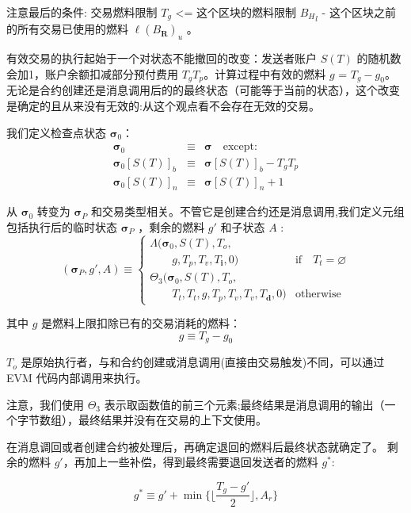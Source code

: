 \documentclass[9pt,oneside]{amsart}
\begin{document}
\begin{multicols}{2}
注意最后的条件: 交易燃料限制 $T_g$  <= 这个区块的燃料限制 ${B_H}_l$ - 这个区块之前的所有交易已使用的燃料 $\ell(B_\mathbf{R})_u$  。


有效交易的执行起始于一个对状态不能撤回的改变：发送者账户 $S(T)$ 的随机数会加1，账户余额扣减部分预付费用 $T_gT_p$。计算过程中有效的燃料 $g$ = $T_g - g_0$。无论是合约创建还是消息调用后的的最终状态（可能等于当前的状态），这个改变是确定的且从来没有无效的:从这个观点看不会存在无效的交易。

我们定义检查点状态 $\boldsymbol{\sigma}_0$：
\begin{eqnarray}
\boldsymbol{\sigma}_0 & \equiv & \boldsymbol{\sigma} \quad \text{except:} \\
\boldsymbol{\sigma}_0[S(T)]_b & \equiv & \boldsymbol{\sigma}[S(T)]_b - T_g T_p \\
\boldsymbol{\sigma}_0[S(T)]_n & \equiv & \boldsymbol{\sigma}[S(T)]_n + 1
\end{eqnarray}


从 $\boldsymbol{\sigma}_0$ 转变为 $\boldsymbol{\sigma}_P$ 和交易类型相关。不管它是创建合约还是消息调用,我们定义元组包括执行后的临时状态 $\boldsymbol{\sigma}_P$ ，剩余的燃料 $g'$ 和子状态 $A$ :
\begin{equation}
(\boldsymbol{\sigma}_P, g', A) \equiv \begin{cases}
\Lambda(\boldsymbol{\sigma}_0, S(T), T_o, &\\ \quad\quad g, T_p, T_v, T_\mathbf{i}, 0) & \text{if} \quad T_t = \varnothing \\
\Theta_{3}(\boldsymbol{\sigma}_0, S(T), T_o, &\\ \quad\quad T_t, T_t, g, T_p, T_v, T_v, T_\mathbf{d}, 0) & \text{otherwise}
\end{cases}
\end{equation}

其中 $g$ 是燃料上限扣除已有的交易消耗的燃料：
\begin{equation}
g \equiv T_g - g_0
\end{equation}

$T_o$ 是原始执行者，与和合约创建或消息调用(直接由交易触发)不同，可以通过 EVM 代码内部调用来执行。

注意，我们使用 $\Theta_{3}$ 表示取函数值的前三个元素;最终结果是消息调用的输出（一个字节数组），最终结果并没有在交易的上下文使用。

在消息调回或者创建合约被处理后，再确定退回的燃料后最终状态就确定了。 剩余的燃料 $g'$，再加上一些补偿，得到最终需要退回发送者的燃料 $g^*$:

\begin{equation}
g^* \equiv g' + \min \{ \Big\lfloor \dfrac{T_g - g'}{2} \Big\rfloor, A_r \}
\end{equation}


\end{multicols}
\end{document}
